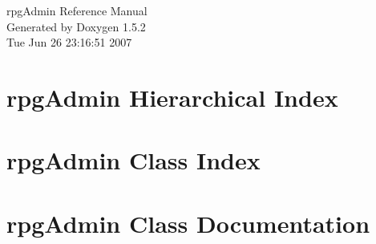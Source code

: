 \documentclass[a4paper]{book}
\begin{document}
\begin{titlepage}
\vspace*{7cm}
\begin{center}
{\Large rpgAdmin Reference Manual}\\
\vspace*{1cm}
{\large Generated by Doxygen 1.5.2}\\
\vspace*{0.5cm}
{\small Tue Jun 26 23:16:51 2007}\\
\end{center}
\end{titlepage}
\clearemptydoublepage
{}
\tableofcontents
\clearemptydoublepage
{}
\chapter{rpgAdmin Hierarchical Index}

\chapter{rpgAdmin Class Index}

\chapter{rpgAdmin Class Documentation}









\printindex
\end{document}
